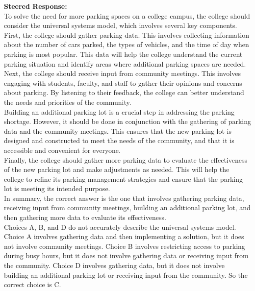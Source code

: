 \documentclass{article} %
\begin{document}
\begin{tcolorbox}[examplebox={Llama-3.2-1B-Instruct on ARC-c: incorrect baseline, correct steering}]
\vspace{0.5em}
\textbf{Steered Response:}\\
To solve the need for more parking spaces on a college campus, the college should consider the universal systems model, which involves several key components.\\First, the college should gather parking data. This involves collecting information about the number of cars parked, the types of vehicles, and the time of day when parking is most popular. This data will help the college understand the current parking situation and identify areas where additional parking spaces are needed.\\Next, the college should receive input from community meetings. This involves engaging with students, faculty, and staff to gather their opinions and concerns about parking. By listening to their feedback, the college can better understand the needs and priorities of the community.\\Building an additional parking lot is a crucial step in addressing the parking shortage. However, it should be done in conjunction with the gathering of parking data and the community meetings. This ensures that the new parking lot is designed and constructed to meet the needs of the community, and that it is accessible and convenient for everyone.\\Finally, the college should gather more parking data to evaluate the effectiveness of the new parking lot and make adjustments as needed. This will help the college to refine its parking management strategies and ensure that the parking lot is meeting its intended purpose.\\In summary, the correct answer is the one that involves gathering parking data, receiving input from community meetings, building an additional parking lot, and then gathering more data to evaluate its effectiveness.\\Choices A, B, and D do not accurately describe the universal systems model. Choice A involves gathering data and then implementing a solution, but it does not involve community meetings. Choice B involves restricting access to parking during busy hours, but it does not involve gathering data or receiving input from the community. Choice D involves gathering data, but it does not involve building an additional parking lot or receiving input from the community. \textcolor{correctcolor}{So the correct choice is C}.
\end{tcolorbox}
\end{document}
